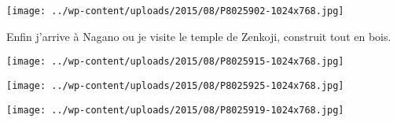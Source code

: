  \newline
\centerline{\texttt{[image: ../wp-content/uploads/2015/08/P8025902-1024x768.jpg]} } 
 \newline
 Enfin j'arrive à Nagano ou je visite le temple de Zenkoji, construit tout en bois. \newline
 \newline
\centerline{\texttt{[image: ../wp-content/uploads/2015/08/P8025915-1024x768.jpg]} } 
 \newline
 \newline
\centerline{\texttt{[image: ../wp-content/uploads/2015/08/P8025925-1024x768.jpg]} } 
 \newline
 \newline
\centerline{\texttt{[image: ../wp-content/uploads/2015/08/P8025919-1024x768.jpg]} } 
 \newline

\newpage
 
